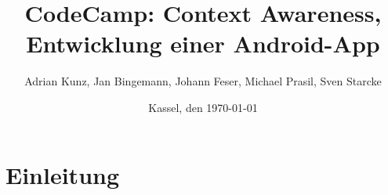 \documentclass{scrartcl}
\begin{document}
	\title{CodeCamp: Context Awareness, Entwicklung einer Android-App}
	\author{Adrian Kunz, Jan Bingemann, Johann Feser, Michael Prasil, Sven Starcke}
	\date{Kassel, den \today}
	
	\maketitle
	
	\tableofcontents
	
	\section{Einleitung}
	
\end{document}

